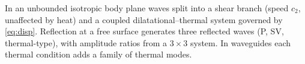 \begin{summarybox}[Summary]
In an unbounded isotropic body plane waves split into a shear branch (speed $c_2$, unaffected by heat) and a coupled dilatational--thermal system governed by \eqref{eq:disp}. Reflection at a free surface generates three reflected waves (P, SV, thermal-type), with amplitude ratios from a $3\times3$ system. In waveguides each thermal condition adds a family of thermal modes.
\end{summarybox}
